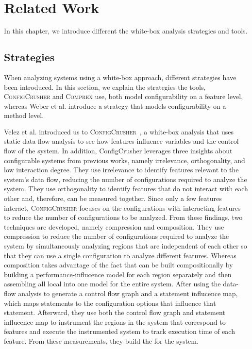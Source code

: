 \chapter{Related Work}\label{ch:relatedwork}

In this chapter, we introduce different the white-box analysis strategies and tools. 

\section{Strategies}\label{analyzing-strats}
When analyzing systems using a white-box approach, different strategies have been introduced. 
In this section, we explain the strategies the tools, \textsc{ConfigCrusher} and \textsc{Comprex} use, 
both model configurability on a feature level, whereas Weber et al. introduce a strategy that models configurability on a method level.

Velez et al. introduced us to \textsc{ConfigCrusher}~\cite{ConfigCrusher}, 
a white-box analysis that uses static data-flow analysis to see how features influence variables and the control flow of the system. 
In addition, ConfigCrusher leverages three insights about configurable systems from previous works, namely irrelevance, orthogonality, 
and low interaction degree. They use irrelevance to identify features relevant to the system's data flow, 
reducing the number of configurations required to analyze the system. They use orthogonality to identify features that do not interact with each other and, 
therefore, can be measured together. Since only a few features interact, 
\textsc{ConfigCrusher} focuses on the configurations with interacting features to reduce the number of configurations to be analyzed. 
From these findings, two techniques are developed, namely compression and composition. 
They use compression to reduce the number of configurations required to analyze the system by simultaneously analyzing regions that are independent of each other 
so that they can use a single configuration to analyze different features. 
Whereas composition takes advantage of the fact that {\perfInfluenceModel} can be built compositionally by building a performance-influcence model 
for each region separately and then assembling all local {\perfInfluenceModel} into one model for the entire system.
After using the data-flow analysis to generate a control flow graph and a statement influcence map, which maps statements to the configuration options 
that influence that statement.
Afterward, they use both the control flow graph and statement influcence map to instrument the regions in the system that correspond to features and execute
the instrumented system to track execution time of each feature. From these measurements, they build the {\perfInfluenceModel} for the system.

